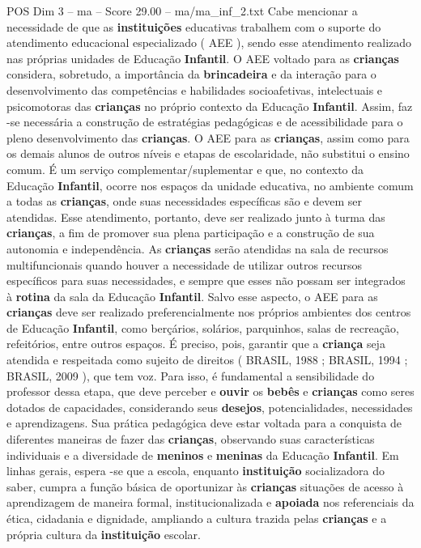 \begin{textsample}{POS Dim 3 – ma – Score 29.00 – ma/ma\_inf\_2.txt}
Cabe mencionar a necessidade de que as \textbf{instituições} educativas trabalhem com o suporte do atendimento educacional especializado ( AEE ), sendo esse atendimento realizado nas próprias unidades de Educação \textbf{Infantil}.
O AEE voltado para as \textbf{crianças} considera, sobretudo, a importância da \textbf{brincadeira} e da interação para o desenvolvimento das competências e habilidades socioafetivas, intelectuais e psicomotoras das \textbf{crianças} no próprio contexto da Educação \textbf{Infantil}.
Assim, faz -se necessária a construção de estratégias pedagógicas e de acessibilidade para o pleno desenvolvimento das \textbf{crianças}.
O AEE para as \textbf{crianças}, assim como para os demais alunos de outros níveis e etapas de escolaridade, não substitui o ensino comum.
É um serviço complementar/suplementar e que, no contexto da Educação \textbf{Infantil}, ocorre nos espaços da unidade educativa, no ambiente comum a todas as \textbf{crianças}, onde suas necessidades específicas são e devem ser atendidas.
Esse atendimento, portanto, deve ser realizado junto à turma das \textbf{crianças}, a fim de promover sua plena participação e a construção de sua autonomia e independência.
As \textbf{crianças} serão atendidas na sala de recursos multifuncionais quando houver a necessidade de utilizar outros recursos específicos para suas necessidades, e sempre que esses não possam ser integrados à \textbf{rotina} da sala da Educação \textbf{Infantil}.
Salvo esse aspecto, o AEE para as \textbf{crianças} deve ser realizado preferencialmente nos próprios ambientes dos centros de Educação \textbf{Infantil}, como berçários, solários, parquinhos, salas de recreação, refeitórios, entre outros espaços.
É preciso, pois, garantir que a \textbf{criança} seja atendida e respeitada como sujeito de direitos ( BRASIL, 1988 ; BRASIL, 1994 ; BRASIL, 2009 ), que tem voz.
Para isso, é fundamental a sensibilidade do professor dessa etapa, que deve perceber e \textbf{ouvir} os \textbf{bebês} e \textbf{crianças} como seres dotados de capacidades, considerando seus \textbf{desejos}, potencialidades, necessidades e aprendizagens.
Sua prática pedagógica deve estar voltada para a conquista de diferentes maneiras de fazer das \textbf{crianças}, observando suas características individuais e a diversidade de \textbf{meninos} e \textbf{meninas} da Educação \textbf{Infantil}.
Em linhas gerais, espera -se que a escola, enquanto \textbf{instituição} socializadora do saber, cumpra a função básica de oportunizar às \textbf{crianças} situações de acesso à aprendizagem de maneira formal, institucionalizada e \textbf{apoiada} nos referenciais da ética, cidadania e dignidade, ampliando a cultura trazida pelas \textbf{crianças} e a própria cultura da \textbf{instituição} escolar.

\end{textsample}
